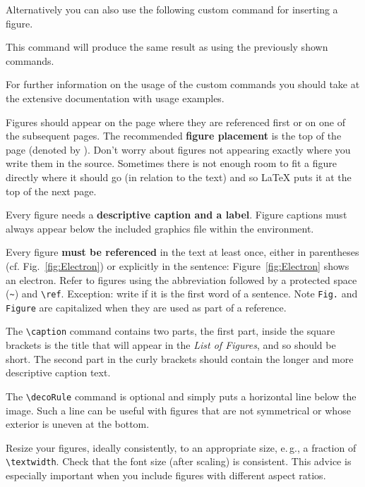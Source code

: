 Alternatively you can also use the following custom command for inserting a figure.

\begin{latex}
\end{latex}

This command will produce the same result as using the previously shown commands.

For further information on the usage of the custom commands you should take at the extensive documentation with usage examples.

Figures should appear on the page where they are referenced first or on one of the subsequent pages. The recommended \textbf{figure placement} is the top of the page (denoted by \code{[t]}). Don't worry about figures not appearing exactly where you write them in the source. Sometimes there is not enough room to fit a figure directly where it should go (in relation to the text) and so LaTeX puts it at the top of the next page.

Every figure needs a \textbf{descriptive caption and a label}. Figure captions must always appear below the included graphics file within the  environment.

Every figure \textbf{must be referenced} in the text at least once, either in parentheses (cf. Fig.~\ref{fig:Electron}) or explicitly in the sentence: Figure~\ref{fig:Electron} shows an electron. Refer to figures using the abbreviation  followed by a protected space (\verb|~|) and \verb|\ref|. Exception: write  if it is the first word of a sentence. Note \verb|Fig.| and \verb|Figure| are capitalized when they are used as part of a reference.

The \verb|\caption| command contains two parts,
the first part, inside the square brackets%
is the title that will appear in the \emph{List of Figures}, and so should be short.
 The second part in the curly brackets should contain the longer and more descriptive caption text.

The \verb|\decoRule| command is optional and simply puts a horizontal line below the image. Such a line can be useful with figures that are not symmetrical or whose exterior is uneven at the bottom.

Resize your figures, ideally consistently, to an appropriate size, e.\,g., a fraction of \texttt{\textbackslash textwidth}. Check that the font size (after scaling) is consistent. This advice is especially important when you include figures with different aspect ratios.

